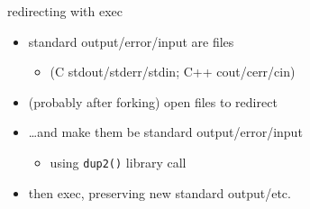 \begin{frame}{redirecting with exec}
\begin{itemize}
\item standard output/error/input are files
    \begin{itemize}
    \item (C stdout/stderr/stdin; C++ cout/cerr/cin)
    \end{itemize}
\vspace{.5cm}
\item (probably after forking) open files to redirect
\item \ldots and make them be standard output/error/input
    \begin{itemize}
    \item using \texttt{dup2()} library call
    \end{itemize}
\item then exec, preserving new standard output/etc.
\end{itemize}
\end{frame}
